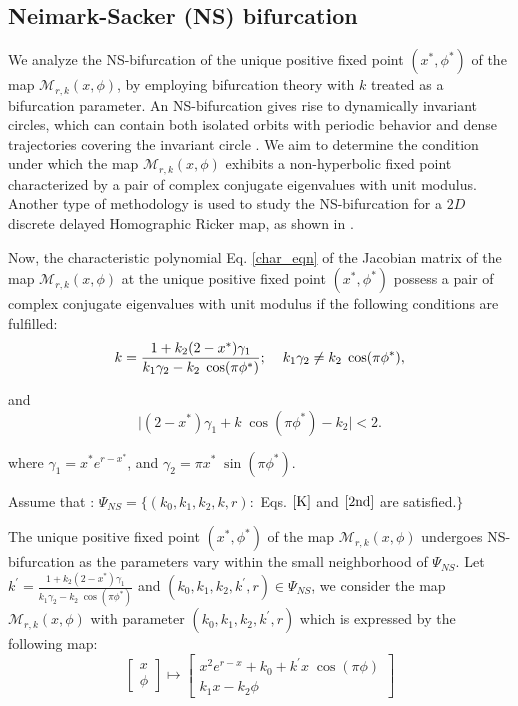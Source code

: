\documentclass{article}
\begin{document}
\subsection{Neimark-Sacker (NS) bifurcation}

We analyze the NS-bifurcation of the unique positive fixed point $(x^*,\phi^*)$ of the map $\mathcal{M}_{r,k}(x,\phi)$, by employing bifurcation theory with $k$ treated as a bifurcation parameter. An NS-bifurcation gives rise to dynamically invariant circles, which can contain both isolated orbits with periodic behavior and dense trajectories covering the invariant circle \cite{din2017global}. We aim to determine the condition under which the map $\mathcal{M}_{r,k}(x,\phi)$ exhibits a non-hyperbolic fixed point characterized by a pair of complex conjugate eigenvalues with unit modulus. Another type of methodology is used to study the NS-bifurcation for a $2D$ discrete delayed Homographic Ricker map, as shown in \cite{chandramouli2025dynamics}.

 Now, the characteristic polynomial Eq. \eqref{char_eqn} of the Jacobian matrix of the map $\mathcal{M}_{r,k}(x,\phi)$ at the unique positive fixed point $(x^*,\phi^*)$ possess a pair of complex conjugate eigenvalues with unit modulus if the following conditions are fulfilled:
\begin{equation}
    k=\frac{1+{k_2}(2-x^*)\gamma_1}{k_{1}\gamma_2-k_2\;\cos(\pi\phi^*)}; \hspace{0.4cm} k_{1}\gamma_2\neq k_2\; \cos(\pi\phi^*), \label{K}
\end{equation}

\noindent and
\begin{equation}
    \big\lvert  (2-x^*)\gamma_1+k\;\cos(\pi\phi^*) -k_2 \big\rvert<2. \label{2nd}
\end{equation}

\noindent where $\gamma_1 = x^*e^{r-x^*}$, and $\gamma_2 = {\pi}{x^*}\;\sin({\pi}{\phi^*})$.

\vspace{0.2cm}

\noindent Assume that :  $\Psi_{NS}=\{(k_0,k_1,k_2,k,r): $ Eqs. $ \eqref{K} $ and $ \eqref{2nd}$ are satisfied.$\}$    

\vspace{0.2cm}
\noindent The unique positive fixed point $(x^*,\phi^*)$ of the map $\mathcal{M}_{r,k}(x,\phi)$ undergoes NS-bifurcation as the parameters vary within the small neighborhood of $\Psi_{NS}$. Let $k^{'}=\frac{1+{k_2}(2-x^*)\gamma_1}{k_{1}\gamma_2-k_2\;\cos(\pi\phi^*)}$ and $(k_0,k_1,k_2,k^{'},r) \in \Psi_{NS}$, we consider the map $\mathcal{M}_{r,k}(x,\phi)$ with parameter $(k_0,k_1,k_2,k^{'},r)$ which is expressed by the following map:
\begin{equation}\label{map_ns_def1}
 \begin{bmatrix} x \\ \phi \end{bmatrix}  \mapsto \begin{bmatrix} x^{2}e^{r-x}+k_0+k^{'}x\;\cos(\pi\phi) \\ k_{1}x-k_{2}\phi \end{bmatrix}
\end{equation}
\end{document}
